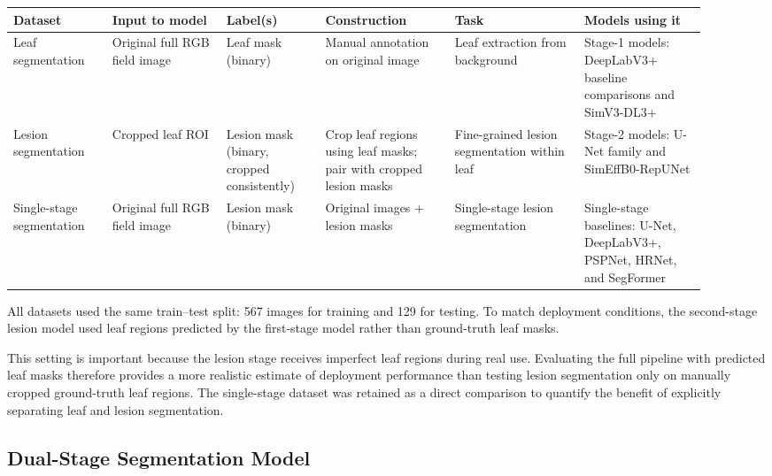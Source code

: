 \documentclass[
]{article}
\begin{document}
\scriptsize
\setlength{\tabcolsep}{2pt}
\begin{longtable}[]{@{}>{\raggedright\arraybackslash}p{0.13\linewidth}>{\raggedright\arraybackslash}p{0.15\linewidth}>{\raggedright\arraybackslash}p{0.13\linewidth}>{\raggedright\arraybackslash}p{0.17\linewidth}>{\raggedright\arraybackslash}p{0.17\linewidth}>{\raggedright\arraybackslash}p{0.16\linewidth}@{}}
\toprule
Dataset & Input to model & Label(s) & Construction & Task & Models using it \\
\midrule
\endhead
Leaf segmentation & Original full RGB field image & Leaf mask (binary) &
Manual annotation on original image & Leaf extraction from background &
Stage-1 models: DeepLabV3+ baseline comparisons and SimV3-DL3+ \\
Lesion segmentation & Cropped leaf ROI & Lesion mask (binary, cropped
consistently) & Crop leaf regions using leaf masks; pair with cropped
lesion masks & Fine-grained lesion segmentation within leaf & Stage-2
models: U-Net family and SimEffB0-RepUNet \\
Single-stage segmentation & Original full RGB field image & Lesion mask
(binary) & Original images + lesion masks & Single-stage lesion
segmentation & Single-stage baselines: U-Net, DeepLabV3+, PSPNet, HRNet,
and SegFormer \\
\bottomrule
\end{longtable}
\setlength{\tabcolsep}{6pt}
\normalsize

All datasets used the same train--test split: 567 images for training
and 129 for testing. To match deployment conditions, the second-stage
lesion model used leaf regions predicted by the first-stage model rather
than ground-truth leaf masks.

This setting is important because the lesion stage receives imperfect
leaf regions during real use. Evaluating the full pipeline with predicted
leaf masks therefore provides a more realistic estimate of deployment
performance than testing lesion segmentation only on manually cropped
ground-truth leaf regions. The single-stage dataset was retained as a
direct comparison to quantify the benefit of explicitly separating leaf
and lesion segmentation.

\hypertarget{dual-stage-segmentation-model}{%
\subsection{Dual-Stage Segmentation
Model}\label{dual-stage-segmentation-model}}
\end{document}
